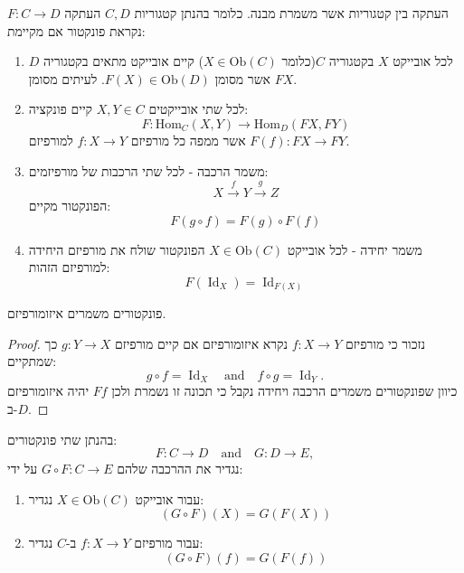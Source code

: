 \documentclass{tstextbook}
\begin{document}
\begin{definition}[פונקטור]
העתקה בין קטגוריות אשר משמרת מבנה. כלומר בהנתן קטגוריות \(C,D\) העתקה \(F:C\to D\) נקראת פונקטור אם מקיימת:

  \begin{enumerate}
    \item לכל אובייקט \(X\) בקטגוריה \(C\)(כלומר \(X \in \mathrm{Ob}(C)\)) קיים אובייקט מתאים בקטגוריה \(D\) אשר מסומן \(F(X)\in \mathrm{Ob}(D)\). לעיתים מסומן \(FX\). 


    \item לכל שתי אובייקטים \(X,Y \in C\) קיים פונקציה: 
$$F:{\mathrm{Hom}}_{C}(X,Y)\to{\mathrm{Hom}}_{D}(F X,F Y)$$
אשר ממפה כל מורפיזם \(f:X\to Y\) למורפיזם \(F(f):FX\to FY\).


    \item משמר הרכבה - לכל שתי הרכבות של מורפיזמים: 
$$X\xrightarrow{f}Y\xrightarrow{g}Z$$
הפונקטור מקיים:
$$F(g\circ  f)=F(g)\circ F(f)$$


    \item משמר יחידה - לכל אובייקט \(X \in \mathrm{Ob}(C)\) הפונקטור שולח את מורפיזם היחידה למורפיזם הזהות: 
$$F(\operatorname{Id}_{X})=\operatorname{Id}_{F(X)}$$


  \end{enumerate}
\end{definition}
\begin{proposition}
פונקטורים משמרים איזומורפיזם.

\end{proposition}
\begin{proof}
נזכור כי מורפיזם \(f:X\to Y\) נקרא איזומורפיזם אם קיים מורפיזם \(g:Y\to X\) כך שמתקיים:
$$g\circ f=\operatorname{Id}_{X}\quad{\mathrm{and}}\quad f\circ g=\operatorname{Id}_{Y}.$$
כיוון שפונקטורים משמרים הרכבה ויחידה נקבל כי תכונה זו נשמרת ולכן \(Ff\) יהיה איזומורפיזם ב-\(D\).

\end{proof}
\begin{definition}
בהנתן שתי פונקטורים:
$$F:C\to D\quad{\mathrm{and}}\quad G:D\to E,$$
נגדיר את ההרכבה שלהם \(G\circ F:C\to E\) על ידי:

  \begin{enumerate}
    \item עבור אובייקט \(X \in \mathrm{Ob}(C)\) נגדיר: 
$$(G\circ F)(X)=G(F(X))$$


    \item עבור מורפיזם \(f:X\to Y\) ב-\(C\) נגדיר: 
$$(G\circ F)(f)=G(F(f))$$


  \end{enumerate}
\end{definition}
\end{document}
